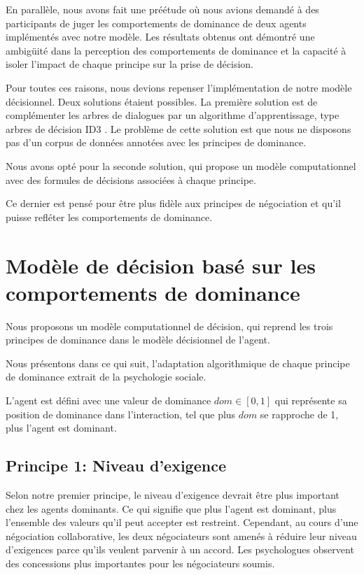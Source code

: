 	En parallèle, nous avons fait une préétude où nous avions demandé à des participants de juger les comportements de dominance de deux agents implémentés avec notre modèle. Les résultats obtenus ont démontré une ambigüité dans la perception des comportements de dominance et la capacité à isoler l'impact de chaque principe sur la prise de décision.
	
	Pour toutes ces raisons, nous devions repenser l'implémentation de notre modèle décisionnel. Deux solutions étaient possibles. La première solution est de complémenter les arbres de dialogues par un algorithme d'apprentissage, type arbres de décision ID3 \cite{utgoff1989incremental}. Le problème de cette solution est que nous ne disposons pas d'un corpus de données annotées avec les principes de dominance. 
	
	Nous avons opté pour la seconde solution, qui propose un modèle computationnel avec des formules de décisions associées à chaque principe. 
	
	Ce dernier est pensé pour être plus fidèle aux principes de négociation et qu'il puisse refléter les comportements de dominance. 


	\section[Modèle de décision]{Modèle de décision basé sur les comportements de dominance}
	
	Nous proposons un modèle computationnel de décision, qui reprend les trois principes de dominance dans le modèle décisionnel de l'agent. 
	
	Nous présentons dans ce qui suit, l'adaptation algorithmique de chaque principe de dominance extrait de la psychologie sociale.
	
	L'agent est défini avec une valeur de dominance $dom \in [0,1]$ qui représente sa position de dominance dans l'interaction, tel que plus $dom$ se rapproche de 1, plus l'agent est dominant. 
	
	\subsection{Principe 1: Niveau d'exigence}
	\label{sec:concessions}
	Selon notre premier principe, le niveau d'exigence devrait être plus important chez les agents dominants. Ce qui signifie que plus l'agent est dominant, plus l'ensemble des valeurs qu'il peut accepter est restreint.
	Cependant, au cours d'une négociation collaborative, les deux négociateurs sont amenés à réduire leur niveau d'exigences parce qu'ils veulent parvenir à un accord. Les psychologues observent des concessions plus importantes pour les négociateurs soumis. 
	
